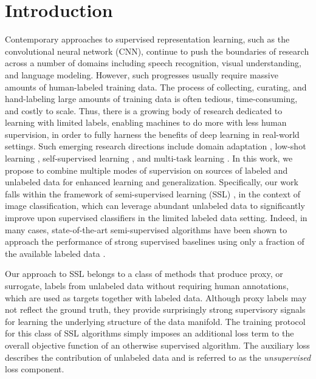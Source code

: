 \documentclass{article}
\begin{document}
\section{Introduction}
Contemporary approaches to supervised representation learning, such as the convolutional neural network (CNN), continue to push the boundaries of research across a number of domains including speech recognition, visual understanding, and language modeling. However, such progresses usually require massive amounts of human-labeled training data. The process of collecting, curating, and hand-labeling large amounts of training data is often tedious, time-consuming, and costly to scale. Thus, there is a growing body of research dedicated to learning with limited labels, enabling machines to do more with less human supervision, in order to fully harness the benefits of deep learning in real-world settings. Such emerging research directions include domain adaptation \cite{da}, low-shot learning \cite{zero-few}, self-supervised learning \cite{revisit-ssl}, and multi-task learning \cite{mtl}. In this work, we propose to combine multiple modes of supervision on sources of labeled and unlabeled data for enhanced learning and generalization. Specifically, our work falls within the framework of semi-supervised learning (SSL) \cite{ssl}, in the context of image classification, which can leverage abundant unlabeled data to significantly improve upon supervised classifiers in the limited labeled data setting. Indeed, in many cases, state-of-the-art semi-supervised algorithms have been shown to approach the performance of strong supervised baselines using only a fraction of the available labeled data \cite{vat2,mean-teacher,self-gan2}.

Our approach to SSL belongs to a class of methods that produce proxy, or surrogate, labels from unlabeled data without requiring human annotations, which are used as targets together with labeled data. Although proxy labels may not reflect the ground truth, they provide surprisingly strong supervisory signals for learning the underlying structure of the data manifold. The training protocol for this class of SSL algorithms simply imposes an additional loss term to the overall objective function of an otherwise supervised algorithm. The auxiliary loss describes the contribution of unlabeled data and is referred to as the \emph{unsupervised} loss component.
\end{document}
